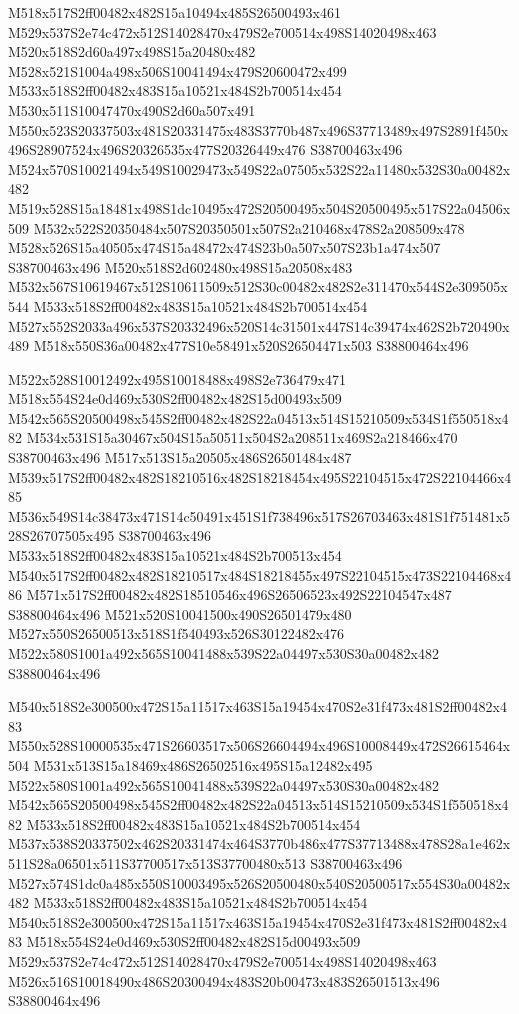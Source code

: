 \documentclass{article}
\begin{document}
\begin{multicols}{2}
M518x517S2ff00482x482S15a10494x485S26500493x461 M529x537S2e74c472x512S14028470x479S2e700514x498S14020498x463 M520x518S2d60a497x498S15a20480x482 M528x521S1004a498x506S10041494x479S20600472x499 M533x518S2ff00482x483S15a10521x484S2b700514x454 M530x511S10047470x490S2d60a507x491 M550x523S20337503x481S20331475x483S3770b487x496S37713489x497S2891f450x496S28907524x496S20326535x477S20326449x476 S38700463x496 M524x570S10021494x549S10029473x549S22a07505x532S22a11480x532S30a00482x482 M519x528S15a18481x498S1dc10495x472S20500495x504S20500495x517S22a04506x509 M532x522S20350484x507S20350501x507S2a210468x478S2a208509x478 M528x526S15a40505x474S15a48472x474S23b0a507x507S23b1a474x507 S38700463x496 M520x518S2d602480x498S15a20508x483 M532x567S10619467x512S10611509x512S30c00482x482S2e311470x544S2e309505x544 M533x518S2ff00482x483S15a10521x484S2b700514x454 M527x552S2033a496x537S20332496x520S14c31501x447S14c39474x462S2b720490x489 M518x550S36a00482x477S10e58491x520S26504471x503 S38800464x496

M522x528S10012492x495S10018488x498S2e736479x471 M518x554S24e0d469x530S2ff00482x482S15d00493x509 M542x565S20500498x545S2ff00482x482S22a04513x514S15210509x534S1f550518x482 M534x531S15a30467x504S15a50511x504S2a208511x469S2a218466x470 S38700463x496 M517x513S15a20505x486S26501484x487 M539x517S2ff00482x482S18210516x482S18218454x495S22104515x472S22104466x485 M536x549S14c38473x471S14c50491x451S1f738496x517S26703463x481S1f751481x528S26707505x495 S38700463x496 M533x518S2ff00482x483S15a10521x484S2b700513x454 M540x517S2ff00482x482S18210517x484S18218455x497S22104515x473S22104468x486 M571x517S2ff00482x482S18510546x496S26506523x492S22104547x487 S38800464x496 M521x520S10041500x490S26501479x480 M527x550S26500513x518S1f540493x526S30122482x476 M522x580S1001a492x565S10041488x539S22a04497x530S30a00482x482 S38800464x496

M540x518S2e300500x472S15a11517x463S15a19454x470S2e31f473x481S2ff00482x483 M550x528S10000535x471S26603517x506S26604494x496S10008449x472S26615464x504 M531x513S15a18469x486S26502516x495S15a12482x495 M522x580S1001a492x565S10041488x539S22a04497x530S30a00482x482 M542x565S20500498x545S2ff00482x482S22a04513x514S15210509x534S1f550518x482 M533x518S2ff00482x483S15a10521x484S2b700514x454 M537x538S20337502x462S20331474x464S3770b486x477S37713488x478S28a1e462x511S28a06501x511S37700517x513S37700480x513 S38700463x496 M527x574S1dc0a485x550S10003495x526S20500480x540S20500517x554S30a00482x482 M533x518S2ff00482x483S15a10521x484S2b700514x454 M540x518S2e300500x472S15a11517x463S15a19454x470S2e31f473x481S2ff00482x483 M518x554S24e0d469x530S2ff00482x482S15d00493x509 M529x537S2e74c472x512S14028470x479S2e700514x498S14020498x463 M526x516S10018490x486S20300494x483S20b00473x483S26501513x496 S38800464x496


\end{multicols}
\end{document}
